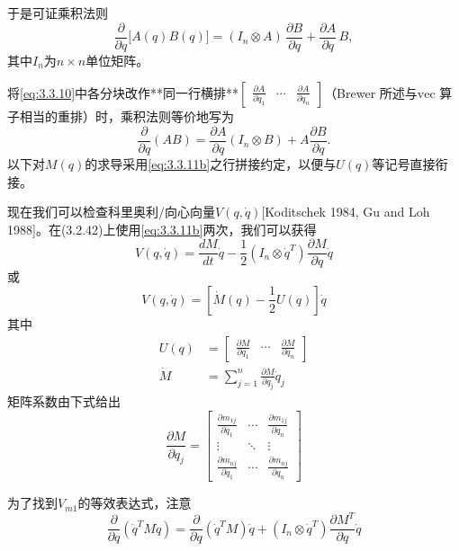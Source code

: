\documentclass[12pt,a4paper]{ctexart}
\begin{document}
于是可证乘积法则
\begin{equation}\label{eq:3.3.11}
\frac{\partial}{\partial q}\bigl[A(q)B(q)\bigr] = (I_n \otimes A)\,\frac{\partial B}{\partial q} + \frac{\partial A}{\partial q}\,B,
\end{equation}
其中$I_n$为$n\times n$单位矩阵。

将\eqref{eq:3.3.10}中各分块改作**同一行横排**$\begin{bmatrix}\frac{\partial A}{\partial q_1}&\cdots&\frac{\partial A}{\partial q_n}\end{bmatrix}$（Brewer 所述与$\mathrm{vec}$ 算子相当的重排）时，乘积法则等价地写为
\begin{equation}\label{eq:3.3.11b}
\frac{\partial}{\partial q}(AB) = \frac{\partial A}{\partial q}(I_n \otimes B) + A\frac{\partial B}{\partial q}.
\end{equation}
以下对$M(q)$的求导采用\eqref{eq:3.3.11b}之行拼接约定，以便与$U(q)$等记号直接衔接。

现在我们可以检查科里奥利/向心向量$V(q,\dot{q})$[Koditschek 1984, Gu and Loh 1988]。在(3.2.42)上使用\eqref{eq:3.3.11b}两次，我们可以获得
\begin{equation}
V(q,\dot{q}) = \frac{dM}{dt}\dot{q} - \frac{1}{2}(I_n \otimes \dot{q}^T)\frac{\partial M}{\partial q}\dot{q}
\end{equation}
或
\begin{equation}
V(q,\dot{q}) = [\dot{M}(q) - \frac{1}{2}U(q)]\dot{q}
\end{equation}
其中
\begin{align}
U(q) &= \begin{bmatrix} \frac{\partial M}{\partial q_1} & \cdots & \frac{\partial M}{\partial q_n} \end{bmatrix} \\
\dot{M} &= \sum_{j=1}^{n}\frac{\partial M}{\partial q_j}\dot{q}_j
\end{align}
矩阵系数由下式给出
\begin{equation}
\frac{\partial M}{\partial q_j} = \begin{bmatrix} \frac{\partial m_{1j}}{\partial q_1} & \cdots & \frac{\partial m_{1j}}{\partial q_n} \\ \vdots & \ddots & \vdots \\ \frac{\partial m_{nj}}{\partial q_1} & \cdots & \frac{\partial m_{nj}}{\partial q_n} \end{bmatrix}
\end{equation}

为了找到$V_{m1}$的等效表达式，注意
\begin{equation}
\frac{\partial}{\partial q}(\dot{q}^T M \dot{q}) = \frac{\partial}{\partial q}(\dot{q}^T M) \dot{q} + (I_n \otimes \dot{q}^T)\frac{\partial M^T}{\partial q}\dot{q}
\end{equation}
\end{document}
